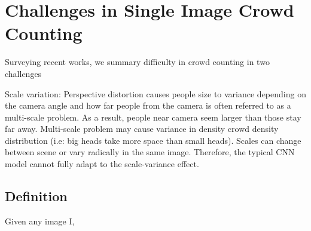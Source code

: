 \section{Challenges in Single Image Crowd Counting}
Surveying recent works, we summary difficulty in crowd counting in two challenges

Scale variation: Perspective distortion causes people size to variance depending on the camera angle and how far people from the camera is often referred to as a multi-scale problem. As a result, people near camera seem larger than those stay far away. Multi-scale problem may cause variance in density crowd density distribution (i.e: big heads take more space than small heads). Scales can change between scene or vary radically in the same image. Therefore, the typical CNN model cannot fully adapt to the scale-variance effect. 



\subsection{Definition}

Given any image I, 